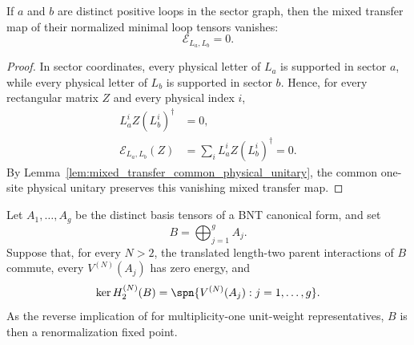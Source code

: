\begin{lemma}
    \label{lem:beigi_normalized_minimal_loop_mixed_transfer_zero}
    \leanok
    If $a$ and $b$ are distinct positive loops in the sector graph, then the
    mixed transfer map of their normalized minimal loop tensors vanishes:
    \[
        \mathcal E_{L_a,L_b}=0.
    \]
\end{lemma}

\begin{proof}
    \leanok
    In sector coordinates, every physical letter of $L_a$ is supported in
    sector $a$, while every physical letter of $L_b$ is supported in sector
    $b$. Hence, for every rectangular matrix $Z$ and every physical index $i$,
    \begin{align}
        L_a^i Z (L_b^i)^\dagger & = 0,                                  \\
        \mathcal E_{L_a,L_b}(Z)
                                & = \sum_i L_a^i Z (L_b^i)^\dagger = 0.
    \end{align}
    By Lemma~\ref{lem:mixed_transfer_common_physical_unitary}, the common
    one-site physical unitary preserves this vanishing mixed transfer map.
\end{proof}

\begin{lemma}
    \label{thm:nncph_implies_rfp_basis_direct_sum}
    \leanok
    Let $A_1,\ldots,A_g$ be the distinct basis tensors of a BNT canonical
    form, and set
    \[
        B=\bigoplus_{j=1}^g A_j .
    \]
    Suppose that, for every $N>2$, the translated length-two parent
    interactions of $B$ commute, every $V^{(N)}(A_j)$ has zero energy, and
    \[
        \ker H_2^{(N)}(B)
        =
        \spn\{V^{(N)}(A_j):j=1,\ldots,g\}.
    \]
    As the reverse implication of
    \cite[Theorem~3.10]{Cirac2016MPDO_arXiv} for multiplicity-one unit-weight
    representatives, $B$ is then a renormalization fixed point.
\end{lemma}

